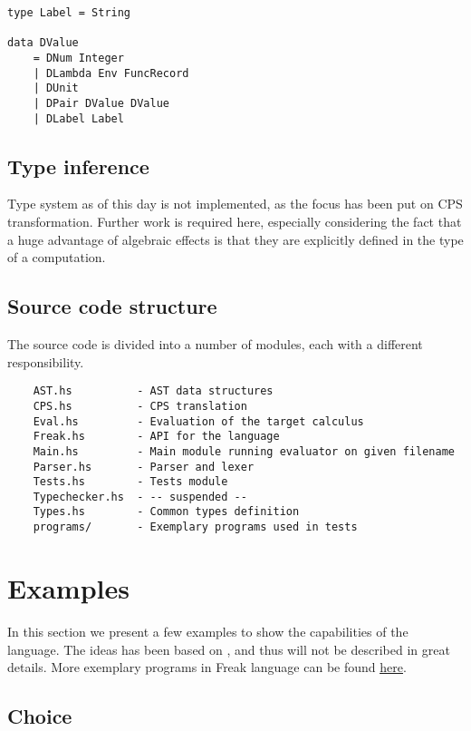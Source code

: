 \documentclass{article}
\theoremstyle{definition}
\theoremstyle{lemma}
\theoremstyle{observation}
\theoremstyle{theorem}
\begin{document}
    \begin{verbatim}
type Label = String

data DValue
    = DNum Integer
    | DLambda Env FuncRecord
    | DUnit
    | DPair DValue DValue
    | DLabel Label
    \end{verbatim}


    \subsection{Type inference}

    Type system as of this day is not implemented, as the focus has been put
    on CPS transformation. Further work is required here, especially considering
    the fact that a huge advantage of algebraic effects is that they are explicitly
    defined in the type of a computation.

    \subsection{Source code structure}

    The source code is divided into a number of modules, each with a different
    responsibility.

    \begin{verbatim}
    AST.hs          - AST data structures
    CPS.hs          - CPS translation
    Eval.hs         - Evaluation of the target calculus
    Freak.hs        - API for the language
    Main.hs         - Main module running evaluator on given filename
    Parser.hs       - Parser and lexer
    Tests.hs        - Tests module
    Typechecker.hs  - -- suspended --
    Types.hs        - Common types definition
    programs/       - Exemplary programs used in tests
    \end{verbatim}

\section{Examples}

    In this section we present a few examples to show the capabilities of the
    language. The ideas has been based on \cite{programming-in-eff}, and thus will not be
    described in great details. More exemplary programs in Freak language can
    be found \href{https://github.com/Tomatosoup97/freak/tree/master/src/programs}{\underline{here}}.

    \subsection{Choice}
    \label{sec:choice-example}
\end{document}
